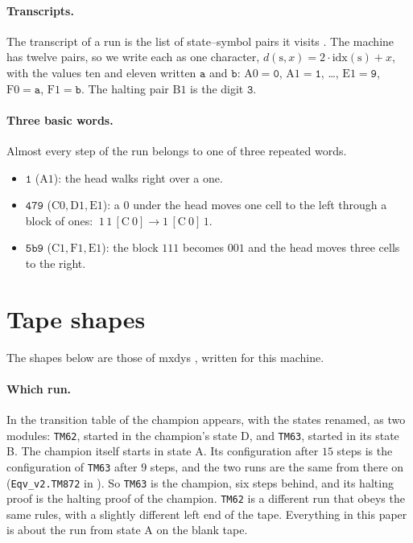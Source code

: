 \documentclass[11pt]{article}
\theoremstyle{remark}
\newcommand{\st}[1]{\mathrm{#1}}
\newcommand{\w}[1]{\mathtt{#1}}
\begin{document}
\paragraph{Transcripts.} The transcript of a run is the list of state--symbol
pairs it visits \cite{bbchallenge}. The machine has twelve pairs, so we write
each as one character,
$d(\st{s},x)=2\cdot\mathrm{idx}(\st{s})+x$, with the values ten and eleven written
$\w{a}$ and $\w{b}$:
$\st{A}0=\w0$, $\st{A}1=\w1$, \dots, $\st{E}1=\w9$, $\st{F}0=\w{a}$, $\st{F}1=\w{b}$.
The halting pair $\st{B}1$ is the digit $\w3$.

\paragraph{Three basic words.} Almost every step of the run belongs to one of
three repeated words.
\begin{itemize}
\item $\w1$ ($\st{A}1$): the head walks right over a one.
\item $\w{479}$ ($\st{C}0,\st{D}1,\st{E}1$): a $0$ under the head moves one cell
to the left through a block of ones:
$\ 1\,1\,[\st{C}\ 0] \to 1\,[\st{C}\ 0]\,1$.
\item $\w{5b9}$ ($\st{C}1,\st{F}1,\st{E}1$): the block $111$ becomes $001$ and the
head moves three cells to the right.
\end{itemize}

\section{Tape shapes}\label{sec:shapes}

The shapes below are those of mxdys \cite{mxdys}, written for this machine.

\paragraph{Which run.} In \cite{mxdys} the transition table of the champion
appears, with the states renamed, as two modules: \texttt{TM62}, started in the
champion's state D, and \texttt{TM63}, started in its state B. The champion
itself starts in state A. Its configuration after $15$ steps is the
configuration of \texttt{TM63} after $9$ steps, and the two runs are the same
from there on (\texttt{Eqv\_v2.TM872} in \cite{mxdys}). So \texttt{TM63} is the
champion, six steps behind, and its halting proof is the halting proof of the
champion. \texttt{TM62} is a different run that obeys the same rules, with a
slightly different left end of the tape. Everything in this paper is about the
run from state A on the blank tape.
\end{document}
